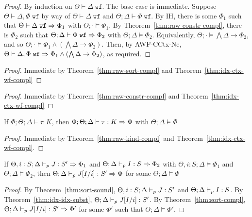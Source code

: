 \idxctxwfcompl*
\begin{proof}
By induction on $\Theta \vdash \Delta \; \texttt{wf}$. The base case is immediate.
Suppose $\Theta \vdash \Delta,\Phi \; \texttt{wf}$ by way of $\Theta \vdash \Delta \; \texttt{wf}$ and $\Theta ; \Delta \vdash \Phi \; \texttt{wf}$.
By IH, there is some $\Phi_1$ such that $\Theta \vdash \Delta \; \texttt{wf} \Rightarrow \Phi_1$ with $\Theta ; \cdot \vDash \Phi_1$. By Theorem~\ref{thm:raw-constr-compl}, there is $\Phi_2$ such that $\Theta ; \Delta \vdash \Phi \; \texttt{wf} \Rightarrow \Phi_2$ with $\Theta ; \Delta \vDash \Phi_2$. Equivalently, $\Theta ; \cdot \vDash \bigwedge \Delta \to \Phi_2$, and so $\Theta ; \cdot \vDash \Phi_1 \wedge (\bigwedge \Delta \to \Phi_2)$. Then, by AWF-CCtx-Ne, $\Theta \vdash \Delta,\Phi \; \texttt{wf} \Rightarrow \Phi_1 \wedge (\bigwedge \Delta \to \Phi_2)$, as required.
\end{proof}

\sortcompl*
\begin{proof}
Immediate by Theorem~\ref{thm:raw-sort-compl} and Theorem~\ref{thm:idx-ctx-wf-compl}
\end{proof}

\constrcompl*
\begin{proof}
Immediate by Theorem~\ref{thm:raw-constr-compl} and Theorem~\ref{thm:idx-ctx-wf-compl}
\end{proof}

\begin{theorem}
If $\Phi;\Theta;\Delta \vdash \tau : K$, then $\Phi;\Theta;\Delta \vdash \tau : K \Rightarrow \Phi$ with $\Theta ; \Delta \vDash \Phi$
\label{thm:raw-kind-compl}
\end{theorem}

\kindcompl*
\begin{proof}
Immediate by Theorem~\ref{thm:raw-kind-compl} and Theorem~\ref{thm:idx-ctx-wf-compl}.
\end{proof}

\subtynerefl*

\subtynfrefl*

\subtynftrans*


\begin{theorem}
If $\Theta, i : S ; \Delta \vdash_p J : S' \Rightarrow \Phi_1$ and $\Theta ; \Delta \vdash_p I : S \Rightarrow \Phi_2$ with
$\Theta, i : S ; \Delta \vDash \Phi_1$ and $\Theta; \Delta \vDash \Phi_2$, then
$\Theta ; \Delta \vdash_p J[I/i] : S' \Rightarrow \Phi$ for some $\Theta ; \Delta \vDash \Phi$
\label{idx-idx-algo-subst}
\end{theorem}
\begin{proof}
By Theorem~\ref{thm:sort-sound}, $\Theta, i :S ; \Delta \vdash_p J : S'$ and $\Theta ; \Delta \vdash_p I : S$.
By Theorem~\ref{thm:idx-idx-subst}, $\Theta ; \Delta \vdash_p J[I/i] : S'$.
By Theorem~\ref{thm:sort-compl}, $\Theta ; \Delta \vdash_p J[I/i] : S' \Rightarrow \Phi'$ for some $\Phi'$ such that $\Theta ; \Delta \vDash \Phi'$.
\end{proof}

